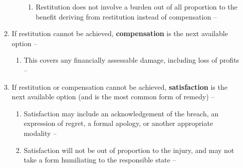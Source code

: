 \begin{enumerate}
\begin{enumerate}
\begin{enumerate}
\begin{enumerate}
                \item Restitution does not involve a burden out of all proportion to the benefit deriving from restitution instead of compensation -- 
            \end{enumerate}
        \end{enumerate}
        \item If restitution cannot be achieved, \textbf{compensation} is the next available option -- 
        \begin{enumerate}
            \item This covers any financially assessable damage, including loss of profits -- 
        \end{enumerate}
        \item If restitution or compensation cannot be achieved, \textbf{satisfaction} is the next available option (and is the most common form of remedy) -- 
        \begin{enumerate}
            \item Satisfaction may include an acknowledgement of the breach, an expression of regret, a formal apology, or another appropriate modality -- 
            \item Satisfaction will not be out of proportion to the injury, and may not take a form humiliating to the responsible state -- 
        \end{enumerate}
    \end{enumerate}
\end{enumerate}

